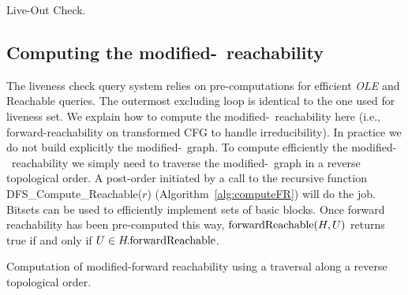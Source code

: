 \begin{algorithm}
  \caption{Live-Out Check.}
  \label{alg:liveoutchk}
\end{algorithm}


\subsection{Computing the modified-\reduced\ reachability}

The liveness check query system relies on pre-computations for efficient \textit{OLE} and \textrm{{\reduced}Reachable} queries.
The outermost excluding loop is identical to the one used for liveness set.
We explain how to compute the modified-\reduced\ reachability here (i.e., 
forward-reachability on transformed CFG to handle irreducibility).
In practice we do not build explicitly the modified-\reduced\ graph.
To compute efficiently the modified-\reduced\ reachability we simply need to traverse the modified-\reduced\ graph in a reverse topological order.
A post-order initiated by a call to the recursive function \textrm{DFS\_Compute\_{\reduced}Reachable}($r$) (Algorithm~\ref{alg:computeFR}) will do the job.
Bitsets can be used to efficiently implement sets of basic blocks.
Once forward reachability has been pre-computed this way, $\textrm{{forward}Reachable}(H,U)$ returns true if and only if $U\in H\!.\textrm{{forward}Reachable}$.

\begin{algorithm}
\caption{Computation of modified-forward reachability using a traversal along a reverse topological order.}
\label{alg:computeFR}
\end{algorithm}

